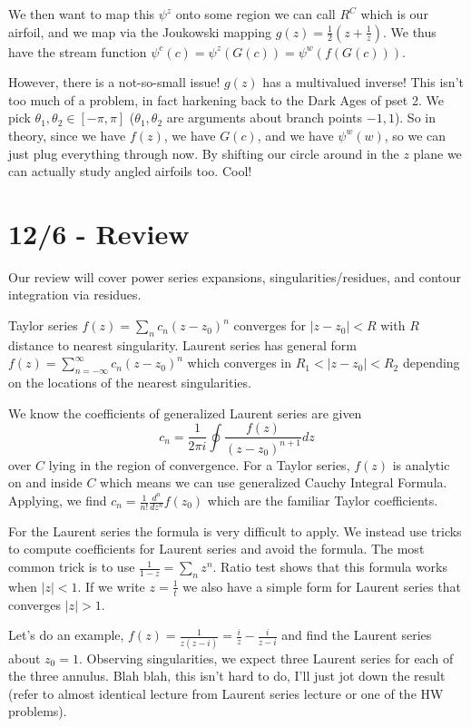 \documentclass[10pt]{report}
\newcommand{\abs}[1]{\left|#1\right|}
\begin{document}
We then want to map this $\psi^z$ onto some region we can call $R^C$ which is our airfoil, and we map via the Joukowski mapping $g(z) = \frac{1}{2}\left( z + \frac{1}{z} \right)$. We thus have the stream function $\psi^c(c) = \psi^z(G(c)) = \psi^w(f(G(c)))$.

However, there is a not-so-small issue! $g(z)$ has a multivalued inverse! This isn't too much of a problem, in fact harkening back to the Dark Ages of pset 2. We pick $\theta_1,\theta_2 \in [-\pi,\pi]$ ($\theta_1,\theta_2$ are arguments about branch points $-1,1$). So in theory, since we have $f(z)$, we have $G(c)$, and we have $\psi^w(w)$, so we can just plug everything through now. By shifting our circle around in the $z$ plane we can actually study angled airfoils too. Cool!

\chapter{12/6 - Review}

Our review will cover power series expansions, singularities/residues, and contour integration via residues.

Taylor series $f(z) = \sum_{n} c_n (z-z_0)^n$ converges for $\abs{z-z_0} < R$ with $R$ distance to nearest singularity. Laurent series has general form $f(z) = \sum_{n=-\infty}^\infty c_n (z-z_0)^n$ which converges in $R_1 < \abs{z-z_0} < R_2$ depending on the locations of the nearest singularities.

We know the coefficients of generalized Laurent series are given
$$c_n = \frac{1}{2\pi i}\oint \frac{f(z)}{(z-z_0)^{n+1}}dz$$
over $C$ lying in the region of convergence. For a Taylor series, $f(z)$ is analytic on and inside $C$ which means we can use generalized Cauchy Integral Formula. Applying, we find $c_n = \frac{1}{n!}\frac{d^n}{dz^n} f(z_0)$ which are the familiar Taylor coefficients.

For the Laurent series the formula is very difficult to apply. We instead use tricks to compute coefficients for Laurent series and avoid the formula. The most common trick is to use $\frac{1}{1-z} = \sum_n z^n$. Ratio test shows that this formula works when $\abs{z} < 1$. If we write $z = \frac{1}{t}$ we also have a simple form for Laurent series that converges $\abs{z} > 1$. 

Let's do an example, $f(z) = \frac{1}{z(z-i)} = \frac{i}{z} - \frac{i}{z-i}$ and find the Laurent series about $z_0 = 1$. Observing singularities, we expect three Laurent series for each of the three annulus. Blah blah, this isn't hard to do, I'll just jot down the result (refer to almost identical lecture from Laurent series lecture or one of the HW problems). 
\end{document}
